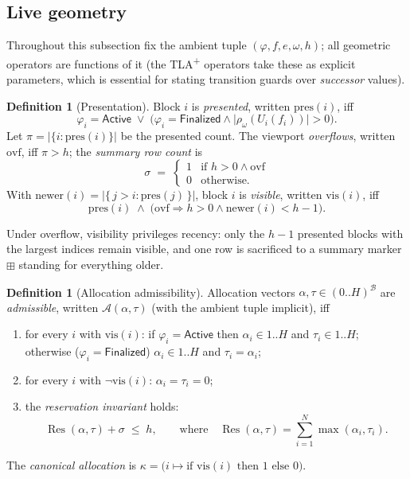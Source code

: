 \documentclass[11pt]{article}
\newcommand{\len}[1]{\lvert #1\rvert}
\newcommand{\Blocks}{\mathcal{B}}
\newcommand{\OvRow}{\boxplus}                  %
\newcommand{\Active}{\mathsf{Active}}
\newcommand{\Finalized}{\mathsf{Finalized}}
\newcommand{\ren}[1]{\rho_{#1}}
\newcommand{\Un}{U}
\newcommand{\pres}{\mathrm{pres}}
\newcommand{\vis}{\mathrm{vis}}
\newcommand{\ovf}{\mathrm{ovf}}
\newcommand{\newer}{\mathrm{newer}}
\newcommand{\AOK}{\mathcal{A}}
\newcommand{\Canon}{\kappa}
\DeclareMathOperator{\Res}{Res}
\theoremstyle{definition}
\newtheorem{definition}[theorem]{Definition}
\theoremstyle{remark}
\begin{document}
\subsection{Live geometry}\label{sec:geometry}

Throughout this subsection fix the ambient tuple
$(\varphi,f,e,\omega,h)$; all geometric operators are functions of it (the
TLA\textsuperscript{+} operators take these as explicit parameters, which is
essential for stating transition guards over \emph{successor} values).

\begin{definition}[Presentation]\label{def:presented}
Block $i$ is \emph{presented}, written $\pres(i)$, iff
\[
  \varphi_i=\Active
  \;\vee\;
  \bigl(\varphi_i=\Finalized \wedge
        \len{\ren{\omega}(\Un_i(f_i))}>0\bigr).
\]
Let $\pi=\bigl|\{i:\pres(i)\}\bigr|$ be the presented count. The viewport
\emph{overflows}, written $\ovf$, iff $\pi>h$; the \emph{summary row count} is
\[
  \sigma \;=\; \begin{cases} 1 & \text{if } h>0 \wedge \ovf\\
                             0 & \text{otherwise.}\end{cases}
\]
With $\newer(i)=\bigl|\{\,j>i : \pres(j)\,\}\bigr|$, block $i$ is
\emph{visible}, written $\vis(i)$, iff
\[
  \pres(i) \;\wedge\;
  \bigl(\ovf \Rightarrow h>0 \wedge \newer(i)<h-1\bigr).
\]
\end{definition}

Under overflow, visibility privileges recency: only the $h-1$ presented blocks
with the largest indices remain visible, and one row is sacrificed to a
summary marker $\OvRow$ standing for everything older.

\begin{definition}[Allocation admissibility]\label{def:aok}
Allocation vectors $\alpha,\tau\in(0..H)^{\Blocks}$ are \emph{admissible},
written $\AOK(\alpha,\tau)$ (with the ambient tuple implicit), iff
\begin{enumerate}
\item for every $i$ with $\vis(i)$: if $\varphi_i=\Active$ then
  $\alpha_i\in 1..H$ and $\tau_i\in 1..H$; otherwise ($\varphi_i=\Finalized$)
  $\alpha_i\in 1..H$ and $\tau_i=\alpha_i$;
\item for every $i$ with $\neg\vis(i)$: $\alpha_i=\tau_i=0$;
\item the \emph{reservation invariant} holds:
\begin{equation}\label{eq:reservation}
  \Res(\alpha,\tau)+\sigma \;\le\; h,
  \qquad\text{where}\quad
  \Res(\alpha,\tau)=\sum_{i=1}^{N}\max(\alpha_i,\tau_i).
\end{equation}
\end{enumerate}
The \emph{canonical allocation} is
$\Canon = \bigl(i\mapsto \text{if } \vis(i) \text{ then } 1
\text{ else } 0\bigr)$.
\end{definition}
\end{document}
